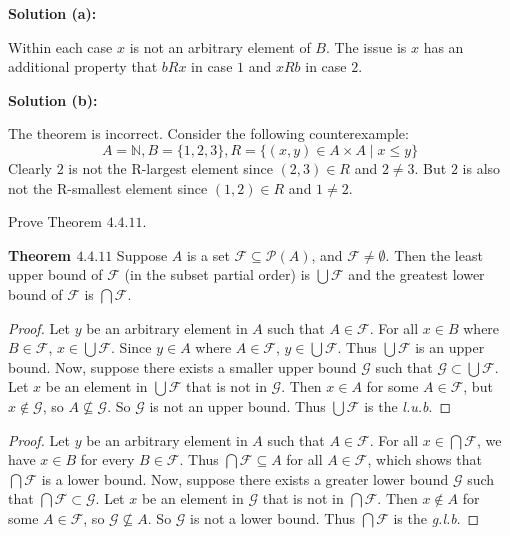 \textbf{Solution (a):}

Within each case $x$ is not an arbitrary element of $B$.
The issue is $x$ has an additional property that $bRx$ in case $1$
and $xRb$ in case $2$.

\textbf{Solution (b):}

The theorem is incorrect. Consider the following counterexample:
\[A = \mathbb{N}, B = \{1, 2, 3\}, R = \{(x, y) \in A \times A \mid x \le y\}\]
Clearly $2$ is not the R-largest element since $(2, 3) \in R$ and $2 \not= 3$.
But $2$ is also not the R-smallest element since $(1, 2) \in R$ and $1 \not= 2$.

\begin{tcolorbox}[title=Problem 23, breakable]
    Prove Theorem $4.4.11$.

    \textbf{Theorem $4.4.11$} Suppose $A$ is a set $\mathcal{F} \subseteq \mathcal{P}(A)$,
    and $\mathcal{F} \not= \emptyset$. Then the least upper 
    bound of $\mathcal{F}$ (in the subset partial order) is $\bigcup\mathcal{F}$
    and the greatest lower bound of $\mathcal{F}$ is $\bigcap\mathcal{F}$.
\end{tcolorbox}

\begin{proof}
    Let $y$ be an arbitrary element in $A$ such that $A \in \mathcal{F}$.
    For all $x \in B$ where $B \in \mathcal{F}$, $x \in \bigcup \mathcal{F}$.
    Since $y \in A$ where $A \in \mathcal{F}$, $y \in \bigcup \mathcal{F}$. 
    Thus $\bigcup \mathcal{F}$ is an upper bound.
    Now, suppose there exists a smaller upper bound $\mathcal{G}$ such that $\mathcal{G} \subset \bigcup \mathcal{F}$.
    Let $x$ be an element in $\bigcup \mathcal{F}$ that is not in $\mathcal{G}$. 
    Then $x \in A$ for some $A \in \mathcal{F}$, but $x \notin \mathcal{G}$, so $A \not\subseteq \mathcal{G}$.
    So $\mathcal{G}$ is not an upper bound.
    Thus $\bigcup \mathcal{F}$ is the \emph{l.u.b}.
\end{proof}

\begin{proof}
    Let $y$ be an arbitrary element in $A$ such that $A \in \mathcal{F}$.
    For all $x \in \bigcap \mathcal{F}$, we have $x \in B$ for every $B \in \mathcal{F}$.
    Thus $\bigcap \mathcal{F} \subseteq A$ for all $A \in \mathcal{F}$,
        which shows that $\bigcap \mathcal{F}$ is a lower bound.
    Now, suppose there exists a greater lower bound $\mathcal{G}$ such that 
    $\bigcap \mathcal{F} \subset \mathcal{G}$.
    Let $x$ be an element in $\mathcal{G}$ that is not in $\bigcap \mathcal{F}$.
    Then $x \notin A$ for some $A \in \mathcal{F}$, so $\mathcal{G} \not\subseteq A$.
    So $\mathcal{G}$ is not a lower bound.
    Thus $\bigcap \mathcal{F}$ is the \emph{g.l.b}.
\end{proof}

